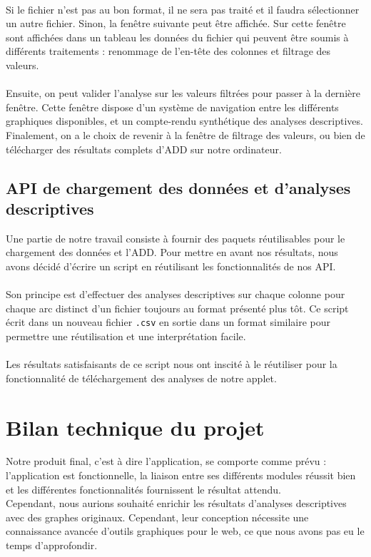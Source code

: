 		\paragraph{}Si le fichier n'est pas au bon format, il ne sera pas traité et il faudra sélectionner un autre fichier. Sinon, la fenêtre suivante peut être affichée.  Sur cette fenêtre sont affichées dans un tableau les données du fichier qui peuvent être soumis à différents traitements : renommage de l'en-tête des colonnes et filtrage des valeurs.
		\paragraph{}Ensuite, on peut valider l'analyse sur les valeurs filtrées pour passer à la dernière fenêtre. Cette fenêtre dispose d'un système de navigation entre les différents graphiques disponibles, et un compte-rendu synthétique des analyses descriptives. Finalement, on a le choix de revenir à la fenêtre de filtrage des valeurs, ou bien de télécharger des résultats complets d'ADD sur notre ordinateur.
		
	\subsection{API de chargement des données et d'analyses descriptives}
		Une partie de notre travail consiste à fournir des paquets réutilisables pour le chargement des données et l'ADD. Pour mettre en avant nos résultats, nous avons décidé d'écrire un script en réutilisant les fonctionnalités de nos API.
		\paragraph{}Son principe est d'effectuer des analyses descriptives sur chaque colonne pour chaque arc distinct d'un fichier toujours au format présenté plus tôt. Ce script écrit dans un nouveau fichier \lstinline!.csv! en sortie dans un format similaire pour permettre une réutilisation et une interprétation facile.
		\paragraph{}Les résultats satisfaisants de ce script nous ont inscité à le réutiliser pour la fonctionnalité de téléchargement des analyses de notre applet.
		
	\section{Bilan technique du projet}
		Notre produit final, c'est à dire l'application, se comporte comme prévu : l'application est fonctionnelle, la liaison entre ses différents modules réussit bien et les différentes fonctionnalités fournissent le résultat attendu.\\
		Cependant, nous aurions souhaité enrichir les résultats d'analyses descriptives avec des graphes originaux. Cependant, leur conception nécessite une connaissance avancée d'outils graphiques pour le web, ce que nous avons pas eu le temps d'approfondir.
